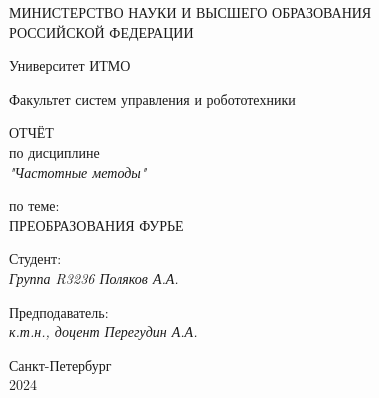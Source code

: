 \thispagestyle{empty}

\begin{center}
    МИНИСТЕРСТВО НАУКИ И ВЫСШЕГО ОБРАЗОВАНИЯ \\ РОССИЙСКОЙ ФЕДЕРАЦИИ

    \vspace{20pt}

    Университет ИТМО

    \vspace{20pt}

    Факультет систем управления и робототехники
\end{center}

\vfill

\begin{center}
    ОТЧЁТ \\  
    по дисциплине \\
    \textit{"Частотные методы"}

    \vspace{20pt}

    по теме: \\
    \uppercase{Преобразования Фурье}
\end{center}

\vfill

    \noindent Студент: \\
    \textit{Группа R3236 \hfill Поляков А.А.}

    \vspace{20pt}

    \noindent Предподаватель: \\
    \textit{к.т.н., доцент \hfill Перегудин А.А.}

\vfill

\begin{center}
    Санкт-Петербург \\ 2024
\end{center}